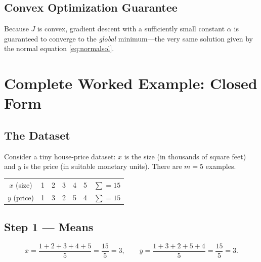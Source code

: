 \documentclass[11pt,a4paper]{report}
\theoremstyle{definition}
\theoremstyle{plain}
\theoremstyle{remark}
\newcommand{\xbar}{\bar{x}}
\newcommand{\ybar}{\bar{y}}
\begin{document}
	\section{Convex Optimization Guarantee}
	Because $J$ is convex, gradient descent with a sufficiently small constant
	$\alpha$ is guaranteed to converge to the \emph{global} minimum---the very same
	solution given by the normal equation \eqref{eq:normalsol}.
	
	\chapter{Complete Worked Example: Closed Form}
	\label{ch:cfexample}
	
	\section{The Dataset}
	Consider a tiny house-price dataset: $x$ is the size (in thousands of square
	feet) and $y$ is the price (in suitable monetary units). There are $m=5$
	examples.
	\begin{center}
		\begin{tabular}{@{}ccccccc@{}}
			\toprule
			$x$ (size) & 1 & 2 & 3 & 4 & 5 & $\sum=15$\\
			$y$ (price) & 1 & 3 & 2 & 5 & 4 & $\sum=15$\\
			\bottomrule
		\end{tabular}
	\end{center}
	
	\section{Step 1 --- Means}
	\[
	\xbar=\frac{1+2+3+4+5}{5}=\frac{15}{5}=3,\qquad
	\ybar=\frac{1+3+2+5+4}{5}=\frac{15}{5}=3 .
	\]
	
\end{document}
